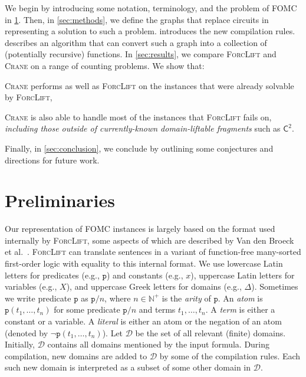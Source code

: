 \documentclass{article}
\theoremstyle{definition}
\theoremstyle{remark}
\newcommand{\Ctwo}{$\mathsf{C}^{2}$}
\begin{document}

We begin by introducing some notation, terminology, and the problem of FOMC in
\cref{sec:recprelims}. Then, in \cref{sec:methods}, we define the graphs that
replace circuits in representing a solution to such a problem. 
introduces the new compilation rules.  describes an
algorithm that can convert such a graph into a collection of (potentially
recursive) functions. In \cref{sec:results}, we compare \textsc{ForcLift} and
\textsc{Crane} on a range of counting problems. We show that:
\begin{enumerate*}[label=(\roman*)]
  \item \textsc{Crane} performs as well as \textsc{ForcLift} on the instances
  that were already solvable by \textsc{ForcLift},
  \item \textsc{Crane} is also able to handle most of the instances that
  \textsc{ForcLift} fails on, \emph{including those outside of currently-known
    domain-liftable fragments} such as \Ctwo{}.
\end{enumerate*}
Finally, in \cref{sec:conclusion}, we conclude by outlining some conjectures and
directions for future work.

\section{Preliminaries}\label{sec:recprelims}

Our representation of FOMC instances is largely based on the format used
internally by \textsc{ForcLift}, some aspects of which are described by Van den
Broeck et al.~. \textsc{ForcLift} can
translate sentences in a variant of function-free many-sorted first-order logic
with equality to this internal format. We use lowercase Latin letters for
predicates (e.g., $\texttt{p}$) and constants (e.g., $x$), uppercase Latin
letters for variables (e.g., $X$), and uppercase Greek letters for domains
(e.g., $\Delta$). Sometimes we write predicate $\texttt{p}$ as $\texttt{p}/n$,
where $n \in \mathbb{N}^{+}$ is the \emph{arity} of $\texttt{p}$. An \emph{atom}
is $\texttt{p}(t_1, \dots, t_n)$ for some predicate $\texttt{p}/n$ and terms
$t_{1}, \dots, t_{n}$. A \emph{term} is either a constant or a variable. A
\emph{literal} is either an atom or the negation of an atom (denoted by
$\neg \texttt{p}(t_1, \dots, t_n)$). Let $\mathcal{D}$ be the set of all
relevant (finite) domains. Initially, $\mathcal{D}$ contains all domains
mentioned by the input formula. During compilation, new domains are added to
$\mathcal{D}$ by some of the compilation rules. Each such new domain is
interpreted as a subset of some other domain in $\mathcal{D}$.
\end{document}
